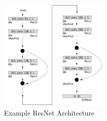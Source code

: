 \documentclass[10pt,twocolumn,letterpaper]{article}
\begin{document}
\begin{figure}[H]
   \centering
   \includegraphics[width=0.475\textwidth]{figures/resnet_architecture.png}
   \caption{Example ResNet Architecture}
   \label{fig:resnet}
\end{figure}
\end{document}
